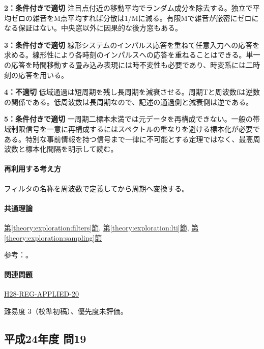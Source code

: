 \noindent\textbf{2：条件付きで適切} 注目点付近の移動平均でランダム成分を除去する。独立で平均ゼロの雑音をM点平均すれば分散は1/Mに減る。有限Mで雑音が厳密にゼロになる保証はない。中央窓以外に因果的な後方窓もある。\par

\noindent\textbf{3：条件付きで適切} 線形システムのインパルス応答を重ねて任意入力への応答を求める。線形性により各時刻のインパルスへの応答を重ねることはできる。単一の応答を時間移動する畳み込み表現には時不変性も必要であり、時変系には二時刻の応答を用いる。\par

\noindent\textbf{4：不適切} 低域通過は短周期を残し長周期を減衰させる。周期Tと周波数fは逆数の関係である。低周波数は長周期なので、記述の通過側と減衰側は逆である。\par

\noindent\textbf{5：条件付きで適切} 一周期二標本未満では元データを再構成できない。一般の帯域制限信号を一意に再構成するにはスペクトルの重なりを避ける標本化が必要である。特別な事前情報を持つ信号まで一律に不可能とする定理ではなく、最高周波数と標本化間隔を明示して読む。\par

\paragraph{再利用する考え方} フィルタの名称を周波数で定義してから周期へ変換する。

\paragraph{共通理論} \hyperref[theory:exploration:filters]{第\ref*{theory:exploration:filters}節}, \hyperref[theory:exploration:lti]{第\ref*{theory:exploration:lti}節}, \hyperref[theory:exploration:sampling]{第\ref*{theory:exploration:sampling}節}

\par 参考：\cite{mit_signals2010,mit_moving2012,scipy_notch,scipy_fft,usgs_processing2000}。

\paragraph{関連問題} \hyperref[q:h28-reg-applied-20]{H28-REG-APPLIED-20}

\par 難易度 3（校準初稿）、優先度未評価。

\subsection{平成24年度 問19}
\label{q:h24-reg-applied-19}

